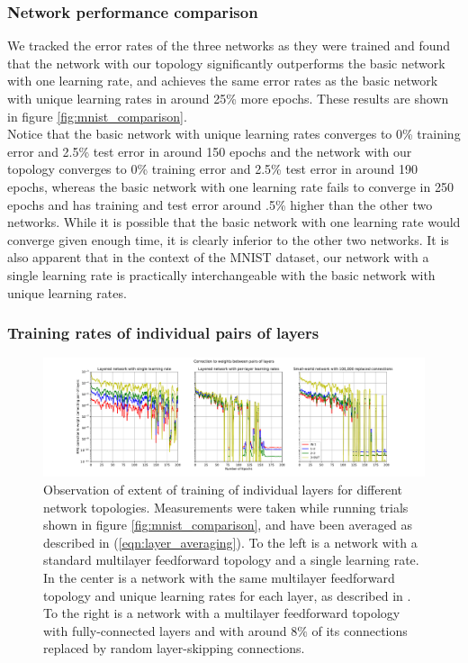 \documentclass{article}
\newcommand{\npar}{\\\indent}
\begin{document}
\subsubsection{Network performance comparison}
\label{sec:network_performance}

We tracked the error rates of the three networks as they were trained and found that the network with our topology significantly outperforms the basic network with one learning rate, and achieves the same error rates as the basic network with unique learning rates in around 25\% more epochs. These results are shown in figure \ref{fig:mnist_comparison}.
\npar
 Notice that the basic network with unique learning rates converges to 0\% training error and 2.5\% test error in around 150 epochs and the network with our topology converges to 0\% training error and 2.5\% test error in around 190 epochs, whereas the basic network with one learning rate fails to converge in 250 epochs and has training and test error around .5\% higher than the other two networks. While it is possible that the basic network with one learning rate would converge given enough time, it is clearly inferior to the other two networks. It is also apparent that in the context of the MNIST dataset, our network with a single learning rate is practically interchangeable with the basic network with unique learning rates.

\subsubsection{Training rates of individual pairs of layers}
\label{sec:mnist_perlayer}

\begin{figure}
  \centering
  \includegraphics[width=\textwidth]{figures/per_layer.pdf}
  \caption{Observation of extent of training of individual layers for different network topologies. Measurements were taken while running trials shown in figure \ref{fig:mnist_comparison}, and have been averaged as described in (\ref{eqn:layer_averaging}). To the left is a network with a standard multilayer feedforward topology and a single learning rate. In the center is a network with the same multilayer feedforward topology and unique learning rates for each layer, as described in \cite{scellier17}. To the right is a network with a multilayer feedforward topology with fully-connected layers and with around $8\%$ of its connections replaced by random layer-skipping connections.}
  \label{fig:mnist_layers}
\end{figure}
\end{document}
